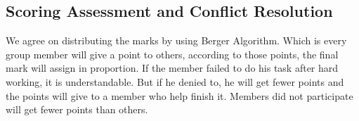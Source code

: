 \subsection{Scoring Assessment and Conflict Resolution}

\noindent We agree on distributing the marks by using Berger Algorithm. Which is every group member will give a point to others, according to those points, the final mark will assign in proportion. If the member failed to do his task after hard working, it is understandable. But if he denied to, he will get fewer points and the points will give to a member who help finish it. Members did not participate will get fewer points than others. 